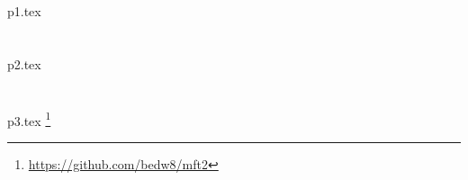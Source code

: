 \documentclass{tarea}
\author{Benjamín Edwards}
\begin{document}
\maketitle

\section{}
{p1.tex}

\section{}
{p2.tex}

\section{}
{p3.tex}
\vfill
\footnote{\url{https://github.com/bedw8/mft2}}{}
\end{document}
